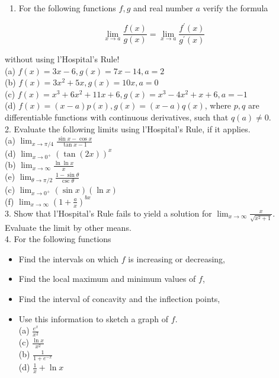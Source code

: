 \documentclass[10pt]{article}
\begin{document}
\begin{enumerate}
  \item For the following functions $f, g$ and real number $a$ verify the formula
\end{enumerate}

$$
\lim _{x \rightarrow a} \frac{f(x)}{g(x)}=\lim _{x \rightarrow a} \frac{f^{\prime}(x)}{g^{\prime}(x)}
$$

without using l'Hospital's Rule!\\
(a) $f(x)=3 x-6, g(x)=7 x-14, a=2$\\
(b) $f(x)=3 x^{2}+5 x, g(x)=10 x, a=0$\\
(c) $f(x)=x^{3}+6 x^{2}+11 x+6, g(x)=x^{3}-4 x^{2}+x+6, a=-1$\\
(d) $f(x)=(x-a) p(x), g(x)=(x-a) q(x)$, where $p, q$ are differentiable functions with continuous derivatives, such that $q(a) \neq 0$.\\
2. Evaluate the following limits using l'Hospital's Rule, if it applies.\\
(a) $\lim _{x \rightarrow \pi / 4} \frac{\sin x-\cos x}{\tan x-1}$\\
(d) $\lim _{x \rightarrow 0^{+}}(\tan (2 x))^{x}$\\
(b) $\lim _{x \rightarrow \infty} \frac{\ln \ln x}{x}$\\
(e) $\lim _{\theta \rightarrow \pi / 2} \frac{1-\sin \theta}{\csc \theta}$\\
(c) $\lim _{x \rightarrow 0^{+}}(\sin x)(\ln x)$\\
(f) $\lim _{x \rightarrow \infty}\left(1+\frac{a}{x}\right)^{b x}$\\
3. Show that l'Hospital's Rule fails to yield a solution for $\lim _{x \rightarrow \infty} \frac{x}{\sqrt{x^{2}+1}}$. Evaluate the limit by other means.\\
4. For the following functions

\begin{itemize}
  \item Find the intervals on which $f$ is increasing or decreasing,
  \item Find the local maximum and minimum values of $f$,
  \item Find the interval of concavity and the inflection points,
  \item Use this information to sketch a graph of $f$.\\
(a) $\frac{e^{x}}{x^{2}}$\\
(c) $\frac{\ln x}{x^{2}}$\\
(b) $\frac{1}{1+e^{-x}}$\\
(d) $\frac{1}{x}+\ln x$
\end{itemize}
\end{document}
